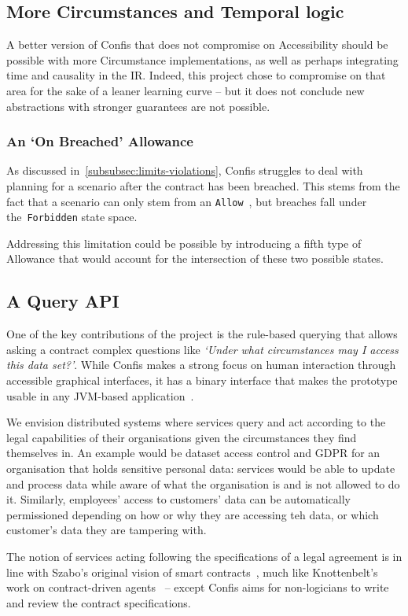\subsection{More Circumstances and Temporal logic}\label{subsec:future:more-circumstances-and-temporal-logic}
A better version of Confis that does not compromise on Accessibility should be possible with more Circumstance implementations, as well as perhaps integrating time and causality in the IR\@.
Indeed, this project chose to compromise on that area for the sake of a leaner learning curve -- but it does not conclude new abstractions with stronger guarantees are not possible.

\subsubsection{An `On Breached' Allowance}

As discussed in~\autoref{subsubsec:limits-violations}, Confis struggles to deal with planning for a scenario after the contract has been breached.
This stems from the fact that a scenario can only stem from an \texttt{Allow}~, but breaches fall under the~\texttt{Forbidden} state space.

Addressing this limitation could be possible by introducing a fifth type of Allowance that would account for the intersection of these two possible states.

\subsection{A Query API}\label{subsec:future:query-api}
One of the key contributions of the project is the rule-based querying that allows asking a contract complex questions like \emph{`Under what circumstances may I access this data set?'}.
While Confis makes a strong focus on human interaction through accessible graphical interfaces, it has a binary interface that makes the prototype usable in any JVM-based application~\cite{venners1998java}.


We envision distributed systems where services query and act according to the legal capabilities of their organisations given the circumstances they find themselves in.
An example would be dataset access control and GDPR for an organisation that holds sensitive personal data: services would be able to update and process data while aware of what the organisation is and is not allowed to do it.
Similarly, employees' access to customers' data can be automatically permissioned depending on how or why they are accessing teh data, or which customer's data they are tampering with.

The notion of services acting following the specifications of a legal agreement is in line with Szabo's original vision of smart contracts~\cite{szabo1997smart-contracts}, much like Knottenbelt's work on contract-driven agents~\cite{knottenbeltContractDriven} -- except Confis aims for non-logicians to write and review the contract specifications.


